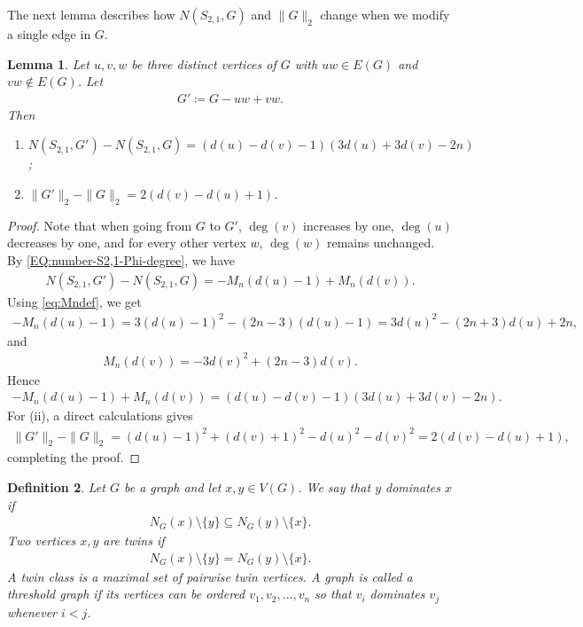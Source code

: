 \documentclass[10pt,a4paper]{article}
\newtheorem{definition}{Definition} [section]
\newtheorem{lemma}[definition]{Lemma}
\newcommand{\normsq}[1]{\|#1\|_2}
\begin{document}
The next lemma describes how $N(S_{2,1},G)$  and $\normsq{G}$ change when we modify a single edge in $G$.

\begin{lemma}\label{lem:transfer}
Let $u,v,w$ be three distinct vertices of $G$ with $uw\in E(G)$ and $vw\notin E(G)$.  Let
\begin{align*}
  G'\coloneqq G-uw+vw.
\end{align*}
Then
\begin{enumerate}[label=\textup{(\roman*)}]
\item $N(S_{2,1},G')-N(S_{2,1},G)=(d(u)-d(v)-1)(3d(u)+3d(v)-2n)$;
\item $\normsq{G'}-\normsq{G}=2(d(v)-d(u)+1)$.
\end{enumerate}
\end{lemma}

\begin{proof}
Note that when going from $G$ to $G'$, $\deg(v)$ increases by one, $\deg(u)$ decreases by one, and for every other vertex $w$, $\deg(w)$ remains unchanged. By \eqref{EQ:number-S2,1-Phi-degree}, we have 
\begin{align*}
  N(S_{2,1},G')-N(S_{2,1},G)=-M_n(d(u)-1)+M_n(d(v)).
\end{align*}
Using \eqref{eq:Mndef}, we get
\begin{align*}
  -M_n(d(u)-1)=3(d(u)-1)^2-(2n-3)(d(u)-1)
  =3d(u)^2-(2n+3)d(u)+2n,
\end{align*}
and
\begin{align*}
  M_n(d(v))=-3d(v)^2+(2n-3)d(v).
\end{align*}
Hence
\begin{align*}
  -M_n(d(u)-1)+M_n(d(v))=(d(u)-d(v)-1)(3d(u)+3d(v)-2n).
\end{align*}
For (ii), a direct calculations gives 
\begin{align*}
\normsq{G'}-\normsq{G}=  (d(u)-1)^2+(d(v)+1)^2-d(u)^2-d(v)^2=2(d(v)-d(u)+1), 
\end{align*}
completing the proof. 
\end{proof}

\begin{definition}
Let $G$ be a graph and let $x,y\in V(G)$.  We say that $y$ \emph{dominates} $x$ if
\begin{align*}
  N_G(x)\setminus\{y\}\subseteq N_G(y)\setminus\{x\}.
\end{align*}
Two vertices $x,y$ are \emph{twins} if
\begin{align*}
  N_G(x)\setminus\{y\}=N_G(y)\setminus\{x\}.
\end{align*}
A \emph{twin class} is a maximal set of pairwise twin vertices.
A graph is called a \emph{threshold graph} if its vertices can be ordered $v_1,v_2,\ldots,v_n$ so that $v_i$ dominates $v_j$ whenever $i<j$.  
\end{definition}
\end{document}
